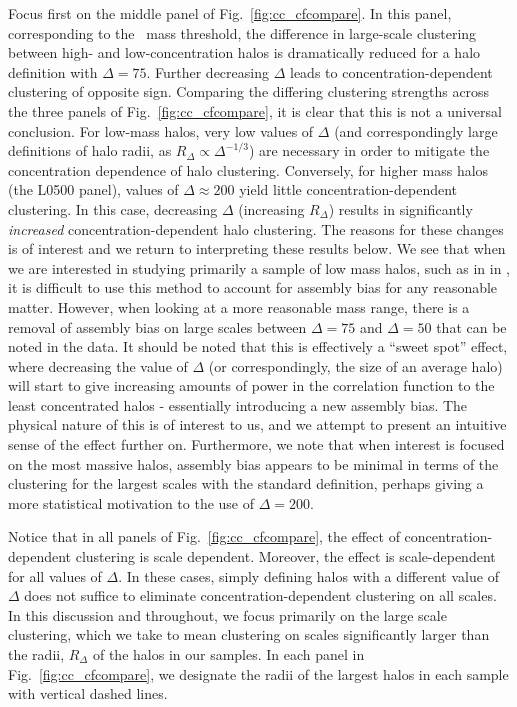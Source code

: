 \documentclass[usenatbib,usegraphicx,letterpaper]{mn2e}
\begin{document}
Focus first on the middle panel of Fig.~\ref{fig:cc_cfcompare}. In this panel, corresponding to the 
\simB~mass threshold, the difference in large-scale clustering between high- and low-concentration halos 
is dramatically reduced for a halo definition with $\Delta=75$. Further decreasing $\Delta$ leads to concentration-dependent 
clustering of opposite sign. Comparing the differing clustering 
strengths across the three panels of Fig.~\ref{fig:cc_cfcompare}, it is clear that this is not a universal conclusion. 
For low-mass halos, very low values of $\Delta$ (and correspondingly large definitions of halo radii, as $R_{\Delta} \propto \Delta^{-1/3}$) 
are necessary in order to mitigate the concentration dependence of halo clustering. Conversely, for higher mass halos (the L0500 panel), 
values of $\Delta \approx 200$ yield little concentration-dependent clustering. In this case, decreasing $\Delta$ (increasing $R_{\Delta}$) results in significantly {\em increased} concentration-dependent halo clustering. The reasons for these changes is of interest and we return to interpreting these results below.
We see that when we are interested in studying primarily a sample of low mass halos, such as in in \simA, it is difficult to use this method to account for assembly bias for any reasonable matter. However, when looking at a more reasonable mass range, there is a removal of assembly bias on large scales between $\Delta = 75$ and $\Delta=50$ that can be noted in the data. It should be noted that this is effectively a ``sweet spot'' effect, where decreasing the value of $\Delta$ (or correspondingly, the size of an average halo) will start to give increasing amounts of power in the correlation function to the least concentrated halos - essentially introducing a new assembly bias. The physical nature of this is of interest to us, and we attempt to present an intuitive sense of the effect further on. Furthermore, we note that when interest is focused on the most massive halos, assembly bias appears to be minimal in terms of the clustering for the largest scales with the standard definition, perhaps giving a more statistical motivation to the use of $\Delta = 200$.

Notice that in all panels of Fig.~\ref{fig:cc_cfcompare}, the effect of concentration-dependent clustering is scale dependent. 
Moreover, the effect is scale-dependent for all values of $\Delta$. In these cases, simply defining halos with a different value 
of $\Delta$ does not suffice to eliminate concentration-dependent clustering on all scales. In this discussion and throughout, 
we focus primarily on the large scale clustering, which we take to mean clustering on scales significantly larger than the radii, 
$R_{\Delta}$ of the halos in our samples. In each panel in Fig.~\ref{fig:cc_cfcompare}, we designate the radii of the largest halos 
in each sample with vertical dashed lines.
\end{document}
